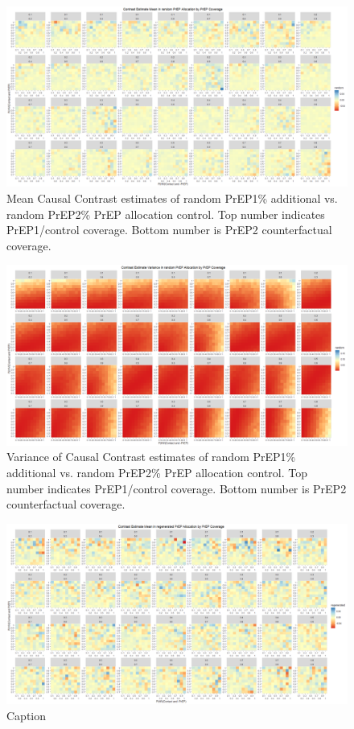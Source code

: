 \documentclass{article}
\theoremstyle{definition}
\begin{document}
\begin{figure}[H]
    \centering
    \includegraphics[scale=0.35]{Figures/PrEP Random Mean Plots.png}
    \caption{Mean Causal Contrast estimates of random PrEP1\% additional vs. random PrEP2\% PrEP allocation control. Top number indicates PrEP1/control coverage. Bottom number is PrEP2 counterfactual coverage.}
    \label{fig:Figure 19}
\end{figure}
\begin{figure}[H]
    \centering
    \includegraphics[scale=0.35]{Figures/PrEP Random Variance Plots.png}
    \caption{Variance of Causal Contrast estimates of random PrEP1\% additional vs. random PrEP2\% PrEP allocation control. Top number indicates PrEP1/control coverage. Bottom number is PrEP2 counterfactual coverage.}
    \label{fig:Figure 20}
\end{figure}
\begin{figure}[H]
    \centering
    \includegraphics[scale=0.35]{Figures/PrEP Regenerated Mean Plots.png}
    \caption{Caption}
    \label{fig:Figure 21}
\end{figure}
\end{document}
